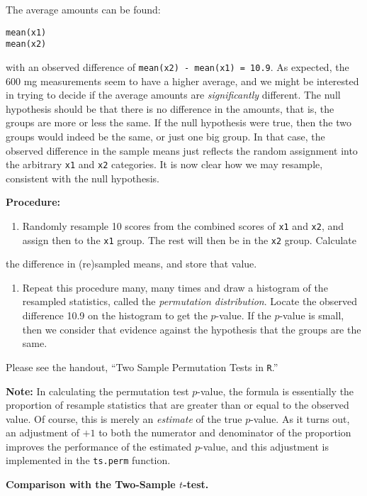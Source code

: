 \documentclass[captions=tableheading]{scrbook}
\begin{document}
The average amounts can be found:

\begin{verbatim}
mean(x1)
mean(x2)
\end{verbatim}


with an observed difference of \texttt{mean(x2) - mean(x1) = 10.9}. As expected, the 600 mg measurements seem to have a higher average, and we might be interested in trying to decide if the average amounts are \emph{significantly} different. The null hypothesis should be that there is no difference in the amounts, that is, the groups are more or less the same. If the null hypothesis were true, then the two groups would indeed be the same, or just one big group. In that case, the observed difference in the sample means just reflects the random assignment into the arbitrary \texttt{x1} and \texttt{x2} categories.
It is now clear how we may resample, consistent with the null hypothesis.

\textbf{Procedure:}


\begin{enumerate}
\item Randomly resample 10 scores from the combined scores of \texttt{x1} and \texttt{x2}, and assign then to the \texttt{x1} group.  The rest will then be in the \texttt{x2} group. Calculate
\end{enumerate}
the difference in (re)sampled means, and store that value.  


\begin{enumerate}
\item Repeat this procedure many, many times and draw a histogram of the resampled statistics, called the \emph{permutation distribution}.  Locate the observed difference 10.9 on the histogram to get the $p$-value. If the $p$-value is small, then we consider that evidence against the hypothesis that the groups are the same.
\end{enumerate}
Please see the handout, ``Two Sample Permutation Tests in \texttt{R}.''

\textbf{Note:} In calculating the permutation test $p$-value, the formula is essentially the proportion of resample statistics that are greater than or equal to the observed value. Of course, this is merely an \emph{estimate} of the true $p$-value. As it turns out, an adjustment of $+1$ to both the numerator and denominator of the
proportion improves the performance of the estimated $p$-value, and this adjustment is implemented in the \texttt{ts.perm} function.

\textbf{Comparison with the Two-Sample $t$-test.}
\end{document}
